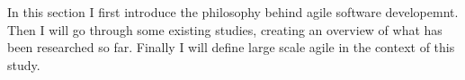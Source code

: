In this section I first introduce the philosophy behind agile software
developemnt. Then I will go through some existing studies, creating an overview
of what has been researched so far. Finally I will define large scale agile in
the context of this study.
